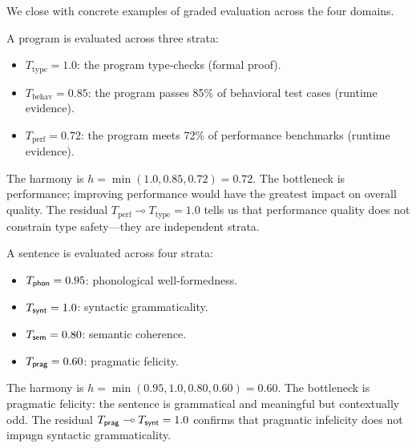 We close with concrete examples of graded evaluation across the four
domains.

\begin{example}[Programs]
\label{ex:grade:programs}
A program is evaluated across three strata:
\begin{itemize}[nosep]
\item $T_{\text{type}} = 1.0$: the program type-checks (formal proof).
\item $T_{\text{behav}} = 0.85$: the program passes 85\% of behavioral
  test cases (runtime evidence).
\item $T_{\text{perf}} = 0.72$: the program meets 72\% of performance
  benchmarks (runtime evidence).
\end{itemize}
The harmony is $h = \min(1.0, 0.85, 0.72) = 0.72$.  The bottleneck
is performance; improving performance would have the greatest impact
on overall quality.  The residual $T_{\text{perf}} \multimap T_{\text{type}} = 1.0$
tells us that performance quality does not constrain type safety---they are
independent strata.
\end{example}

\begin{example}
\label{ex:grade:nl}
A sentence is evaluated across four strata:
\begin{itemize}[nosep]
\item $T_{\mathsf{phon}} = 0.95$: phonological well-formedness.
\item $T_{\mathsf{synt}} = 1.0$: syntactic grammaticality.
\item $T_{\mathsf{sem}} = 0.80$: semantic coherence.
\item $T_{\mathsf{prag}} = 0.60$: pragmatic felicity.
\end{itemize}
The harmony is $h = \min(0.95, 1.0, 0.80, 0.60) = 0.60$.  The
bottleneck is pragmatic felicity: the sentence is grammatical and
meaningful but contextually odd.  The residual
$T_{\mathsf{prag}} \multimap T_{\mathsf{synt}} = 1.0$ confirms that pragmatic
infelicity does not impugn syntactic grammaticality.
\end{example}


